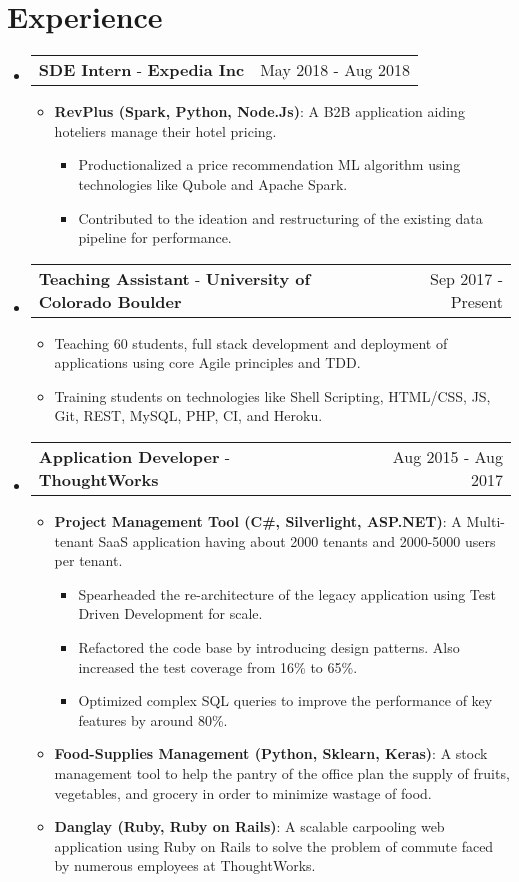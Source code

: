 \documentclass[letterpaper,11pt]{article}
\makeatletter
\newcommand{\resumeItem}[2]{
  \linespread{1.1}
	\item\small{
    	\textbf{#1}{: #2}
  	}
}
\newcommand{\resumePoint}[1]{
	\linespread{1.2}
	\item\small{#1}
}
\newcommand{\resumeExperienceSubheading}[5]{
    \vspace{-3pt}\item
    \begin{tabular*}{0.97\textwidth}{l@{\extracolsep{\fill}}r}
      \textbf{#1} \normalfont{\small#2} - \textbf{#3}\normalfont{#4} & #5 \\
    \end{tabular*}\vspace{-4pt}
}
\newcommand{\resumeSubHeadingListStart}{\begin{itemize}[leftmargin=*]}
\newcommand{\resumeSubHeadingListEnd}{\end{itemize}\vspace{-14pt}}
\newcommand{\resumeItemListStart}{\begin{itemize}}
\newcommand{\resumeItemListEnd}{\end{itemize}\vspace{-2pt}}
\newcommand{\resumeInnerItemListStart}{\begin{itemize}\vspace{-1pt}}
\newcommand{\resumeInnerItemListEnd}{\end{itemize}\vspace{2pt}}
\makeatother
\begin{document}
\section{Experience}
  \resumeSubHeadingListStart
  \resumeExperienceSubheading
      {SDE Intern}{(Data Engineering)}{Expedia Inc}{, Chicago, USA}{May 2018 - Aug 2018}
      \resumeItemListStart
          \resumeItem {RevPlus (Spark, Python, Node.Js)}
          {A B2B application aiding hoteliers manage their hotel pricing.}
          \resumeInnerItemListStart
            \resumePoint{Productionalized a price recommendation ML algorithm using technologies like Qubole and Apache Spark.}
            \resumePoint{Contributed to the ideation and restructuring of the existing data pipeline for performance.}
          \resumeInnerItemListEnd
      \resumeItemListEnd
    \vspace{-5pt}
    \resumeExperienceSubheading
      {Teaching Assistant}{\href{https://www.colorado.edu/cs/csci-3308-software-development-methods-and-tools}{(S/W Dev Methods \& Tools)}}{University of Colorado Boulder}{}{Sep 2017 - Present}
      \resumeItemListStart
          \resumePoint{Teaching 60 students, full stack development and deployment of applications using core Agile principles and TDD.}
          \resumePoint{Training students on technologies like Shell Scripting, HTML/CSS, JS, Git, REST, MySQL, PHP, CI, and Heroku.}
      \resumeItemListEnd
    \resumeExperienceSubheading
      {Application Developer}{}{ThoughtWorks}{, Bangalore, India}{Aug 2015 - Aug 2017}
      \resumeItemListStart
      \resumeItem {Project Management Tool (C\#, Silverlight, ASP.NET)}
          {A Multi-tenant SaaS application having about 2000 tenants and 2000-5000 users per tenant.}
          \resumeInnerItemListStart
            \resumePoint {Spearheaded the re-architecture of the legacy application using Test Driven Development for scale.}
            \resumePoint {Refactored the code base by introducing design patterns. Also increased the test coverage from 16\% to 65\%.}
            \resumePoint {Optimized complex SQL queries to improve the performance of key features by around 80\%.}
          \resumeInnerItemListEnd
        \resumeItem {Food-Supplies Management (Python, Sklearn, Keras)}{A stock management tool to help the pantry of the office plan the supply of fruits, vegetables, and grocery in order to minimize wastage of food.}
      \resumeItem {Danglay (Ruby, Ruby on Rails)}{A scalable carpooling web application using Ruby on Rails to solve the problem of commute faced by numerous employees at ThoughtWorks.}
      \resumeItemListEnd
  \resumeSubHeadingListEnd
\end{document}
